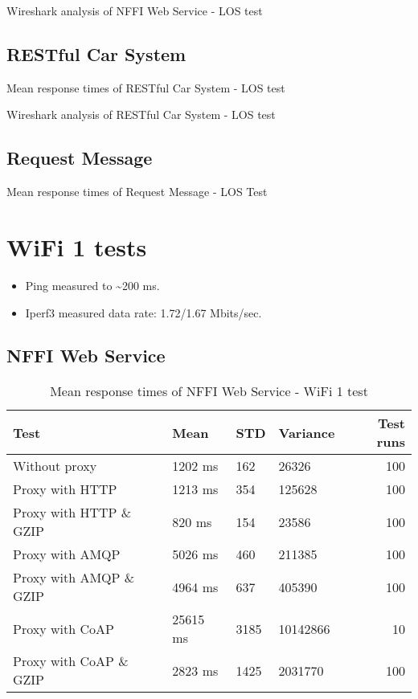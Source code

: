 \begin{appendices}
\begin{table}[H]

\caption{Wireshark analysis of NFFI Web Service - LOS test}
\end{table}


\subsection{RESTful Car System}

\begin{table}[H]

\caption{Mean response times of RESTful Car System - LOS test}
\end{table}

\begin{table}[H]

\caption{Wireshark analysis of RESTful Car System - LOS test}
\end{table}

\subsection{Request Message}
\begin{table}[H]

\caption{Mean response times of Request Message - LOS Test}
\end{table}


\section{WiFi 1 tests}

\begin{itemize}
	\item Ping measured to \textasciitilde 200 ms.
	\item Iperf3 measured data rate: 1.72/1.67 Mbits/sec.
\end{itemize}


\subsection{NFFI Web Service}

\begin{table}[H]
\begin{tabular}{llllr}
\hline
 Test                   &   Mean &   STD &   Variance &   Test runs \\
\hline
  Without proxy & 1202 ms & 162 & 26326 & 100 \\
  Proxy with HTTP & 1213 ms & 354 & 125628 & 100 \\
  Proxy with HTTP \& GZIP & 820 ms & 154 & 23586 & 100 \\
  Proxy with AMQP & 5026 ms & 460 & 211385 & 100 \\
  Proxy with AMQP \& GZIP & 4964 ms & 637 & 405390 & 100\\
  Proxy with CoAP & 25615 ms & 3185 & 10142866 & 10 \\
  Proxy with CoAP \& GZIP & 2823 ms & 1425 & 2031770 & 100 \\
\end{tabular}
\caption{Mean response times of NFFI Web Service - WiFi 1 test}
\end{table}


\end{appendices}
